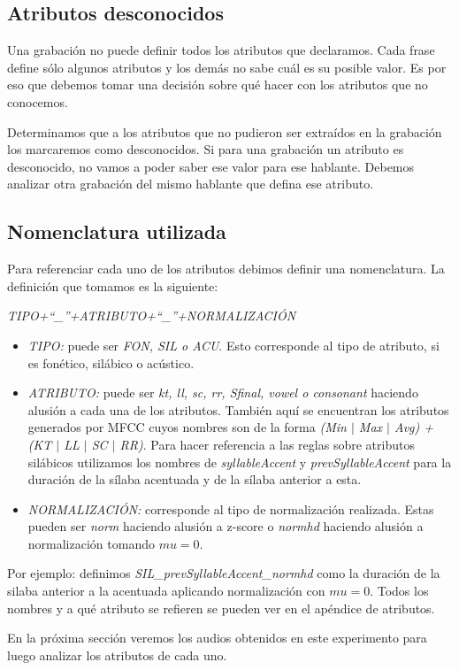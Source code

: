 \subsection{Atributos desconocidos}

Una grabación no puede definir todos los atributos que declaramos. Cada frase define sólo algunos atributos y los demás no sabe cuál es su posible valor. Es por eso que debemos tomar una decisión sobre qué hacer con los atributos que no conocemos. 

Determinamos que a los atributos que no pudieron ser extraídos en la grabación los marcaremos como desconocidos. Si para una grabación un atributo es desconocido, no vamos a poder saber ese valor para ese hablante. Debemos analizar otra grabación del mismo hablante que defina ese atributo.

\subsection{Nomenclatura utilizada}
Para referenciar cada uno de los atributos debimos definir una nomenclatura. La definición que tomamos es la siguiente:
\begin{center}
\textit{TIPO+``\_''+ATRIBUTO+``\_''+NORMALIZACIÓN} 
\end{center}

\begin{itemize}
  \item \emph{TIPO:} puede ser \emph{FON, SIL o ACU}. Esto corresponde al tipo de atributo, si es fonético, silábico o acústico.
  \item \emph{ATRIBUTO:} puede ser \emph{kt, ll, sc, rr, Sfinal, vowel o consonant} haciendo alusión a cada una de los atributos. También aquí se encuentran los atributos generados por MFCC cuyos nombres son de la forma \emph{(Min $|$ Max $|$ Avg) + (KT $|$ LL $|$ SC $|$ RR)}. Para hacer referencia a las reglas sobre atributos silábicos utilizamos los nombres de \emph{syllableAccent} y \emph{prevSyllableAccent} para la duración de la sílaba acentuada y de la sílaba anterior a esta.
  \item \emph{NORMALIZACIÓN:} corresponde al tipo de normalización realizada. Estas pueden ser \emph{norm} haciendo alusión a z-score o \emph{normhd} haciendo alusión a normalización tomando $mu=0$.
\end{itemize}
 
Por ejemplo: definimos \textit{SIL\_prevSyllableAccent\_normhd} como la duración de la silaba anterior a la acentuada aplicando normalización con $mu=0$. Todos los nombres y a qué atributo se refieren se pueden ver en el apéndice de atributos.

En la próxima sección veremos los audios obtenidos en este experimento para luego analizar los atributos de cada uno.